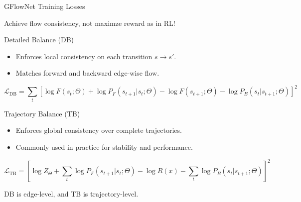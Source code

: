\documentclass[aspectratio=1610]{beamer}
\newcommand{\important}[1]{{\color{green!60!black}#1}}
\begin{document}
\begin{frame}{GFlowNet Training Losses}

\medskip
{} \important{Achieve flow consistency}, \alert{not maximze reward} as in RL!

\bigskip

\begin{block}{Detailed Balance (DB)}
\begin{itemize}
    \item Enforces local consistency on each transition \(s \to s'\).
    \item Matches forward and backward edge-wise flow.
\end{itemize}
\[
\mathcal{L}_{\mathrm{DB}}
= \sum_{t}
\left[
\log F(s_{t}; \Theta) + \log P_F(s_{t+1}|s_t; \Theta)
- \log F(s_{t+1}; \Theta) - \log P_B(s_t|s_{t+1};\Theta)
\right]^2
\]
\end{block}
\begin{block}{Trajectory Balance (TB)}
\begin{itemize}
    \item Enforces global consistency over complete trajectories.
    \item Commonly used in practice for stability and performance.
\end{itemize}
\[
\mathcal{L}_{\mathrm{TB}}
= \left[
\log Z_\Theta + \sum_t \log P_F(s_{t+1}|s_t; \Theta)
- \log R(x)
- \sum_t \log P_B(s_t|s_{t+1};\Theta)
\right]^2
\]
\end{block}

\vspace{0.2em}
 DB is edge-level, and TB is trajectory-level.
\end{frame}
\end{document}
